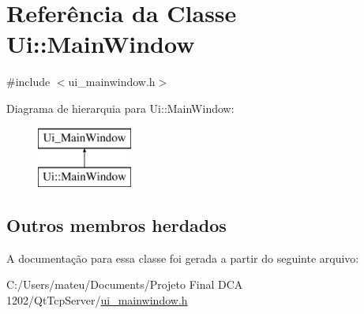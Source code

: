 \hypertarget{class_ui_1_1_main_window}{}\section{Referência da Classe Ui\+:\+:Main\+Window}
\label{class_ui_1_1_main_window}


{\ttfamily \#include $<$ui\+\_\+mainwindow.\+h$>$}

Diagrama de hierarquia para Ui\+:\+:Main\+Window\+:\begin{figure}[H]
\begin{center}
\leavevmode
\includegraphics[height=2.000000cm]{class_ui_1_1_main_window}
\end{center}
\end{figure}
\subsection*{Outros membros herdados}


A documentação para essa classe foi gerada a partir do seguinte arquivo\+:\begin{DoxyCompactItemize}
\item 
C\+:/\+Users/mateu/\+Documents/\+Projeto Final D\+C\+A 1202/\+Qt\+Tcp\+Server/\mbox{\hyperlink{ui__mainwindow_8h}{ui\+\_\+mainwindow.\+h}}\end{DoxyCompactItemize}
